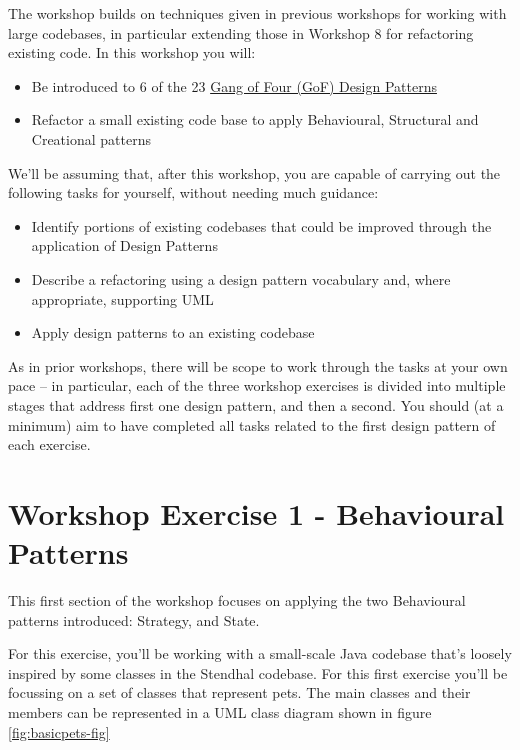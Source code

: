 \documentclass[
]{book}
\providecommand{\tightlist}{%
  \setlength{\itemsep}{0pt}\setlength{\parskip}{0pt}}
\begin{document}
The workshop builds on techniques given in previous workshops for working with large codebases, in particular extending those in Workshop 8 for refactoring existing code. In this workshop you will:

\begin{itemize}
\tightlist
\item
  Be introduced to 6 of the 23 \href{https://en.wikipedia.org/wiki/Design_Patterns}{Gang of Four (GoF) Design Patterns} \citep{GoF}
\item
  Refactor a small existing code base to apply Behavioural, Structural and Creational patterns
\end{itemize}

We'll be assuming that, after this workshop, you are capable of carrying out the following tasks for yourself, without needing much guidance:

\begin{itemize}
\tightlist
\item
  Identify portions of existing codebases that could be improved through the application of Design Patterns
\item
  Describe a refactoring using a design pattern vocabulary and, where appropriate, supporting UML
\item
  Apply design patterns to an existing codebase
\end{itemize}

As in prior workshops, there will be scope to work through the tasks at your own pace -- in particular, each of the three workshop exercises is divided into multiple stages that address first one design pattern, and then a second. You should (at a minimum) aim to have completed all tasks related to the first design pattern of each exercise.

\hypertarget{behave}{%
\section{Workshop Exercise 1 - Behavioural Patterns}\label{behave}}

This first section of the workshop focuses on applying the two Behavioural patterns introduced: Strategy, and State.

For this exercise, you'll be working with a small-scale Java codebase that's loosely inspired by some classes in the Stendhal codebase. For this first exercise you'll be focussing on a set of classes that represent pets. The main classes and their members can be represented in a UML class diagram shown in figure \ref{fig:basicpets-fig}
\end{document}
